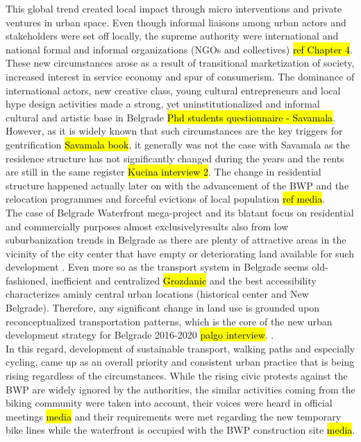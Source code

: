 \documentclass[11pt]{report}
\begin{document}
This global trend created local impact through micro interventions and private ventures in urban space.
Even though informal liaisons among urban actors and stakeholders were set off locally, the supreme  authority were international and national formal and informal organizations (NGOs and collectives) \hl{ref Chapter 4}. %
These new circumstances arose as a result of transitional marketization of society, increased interest in service economy and spur of consumerism.
The dominance of international actors, new creative class, young cultural entrepreneurs and local hype design activities made a strong, yet uninstitutionalized and informal cultural and artistic base in Belgrade \hl{Phd students questionnaire - Savamala}.
However, as it is widely known that such circumstances are the key triggers for gentrification \hl{Savamala book}, it generally was not the case with Savamala as the residence structure has not significantly changed during the years and the rents are still in the same register \hl{Kucina interview 2}.
The change in residential structure happened actually later on with the advancement of the BWP and the relocation programmes and forceful evictions of local population \hl{ref media}.
\\
The case of Belgrade Waterfront mega-project and its blatant focus on residential and commercially purposes almost exclusively\footnotemark results also from low suburbanization trends in Belgrade as there are plenty of attractive areas in the vicinity of the city center that have empty or deteriorating land available for such development \cite{(Hirt 2009)}.
Even more so as the transport system in Belgrade seems old-fashioned, inefficient and centralized \hl{Grozdanic} and the best accessibility characterizes aminly central urban locations (historical center and New Belgrade).
Therefore, any significant change in land use is grounded upon reconceptualized transportation patterns, which is the core of the new urban development strategy for Belgrade 2016-2020 \hl{palgo interview}.
.
\\
In this regard, development of sustainable transport, walking paths and especially cycling, came up as an overall priority and consistent urban practice that is being rising regardless of the circumstances. While the rising civic protests against the BWP are widely ignored by the authorities, the similar activities coming from the biking community were taken into account, their voices were heard in official meetings \hl{media} and their requirements were met regarding the new temporary bike lines while the waterfront is occupied with the BWP construction site \hl{media}.
\end{document}
